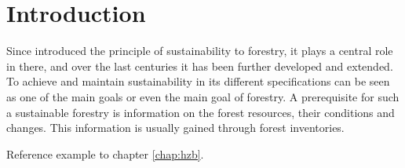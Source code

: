 \chapter{Introduction}
\label{chap:Introduction}
Since \citet{Carlowitz_1713} introduced the principle of sustainability to forestry, it plays a central role in there, and over the last centuries it has been further developed and extended. To achieve and maintain sustainability in its different specifications \citep{Speidel_1984, Schanz_1996} can be seen as one of the main goals or even the main goal of forestry. A prerequisite for such a sustainable forestry is information on the forest resources, their conditions and changes. This information is usually gained through forest inventories.



Reference example to chapter \ref{chap:hzb}.

